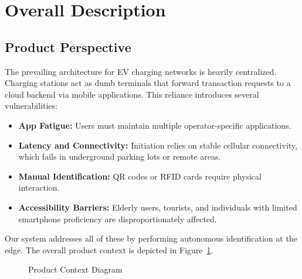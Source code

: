 \documentclass[11pt]{report}
\begin{document}
\section{Overall Description}
\subsection{Product Perspective}
The prevailing architecture for EV charging networks is heavily centralized. Charging stations act as dumb terminals that forward transaction requests to a cloud backend via mobile applications. This reliance introduces several vulnerabilities:
\begin{itemize}
    \item \textbf{App Fatigue:} Users must maintain multiple operator-specific applications.
    \item \textbf{Latency and Connectivity:} Initiation relies on stable cellular connectivity, which fails in underground parking lots or remote areas.
    \item \textbf{Manual Identification:} QR codes or RFID cards require physical interaction.
    \item \textbf{Accessibility Barriers:} Elderly users, tourists, and individuals with limited smartphone proficiency are disproportionately affected.
\end{itemize}
Our system addresses all of these by performing autonomous identification at the edge. The overall product context is depicted in Figure~\ref{fig:product_context}.

\begin{figure}[H]
\centering
{}
\caption{Product Context Diagram}
\label{fig:product_context}
\end{figure}
\end{document}
